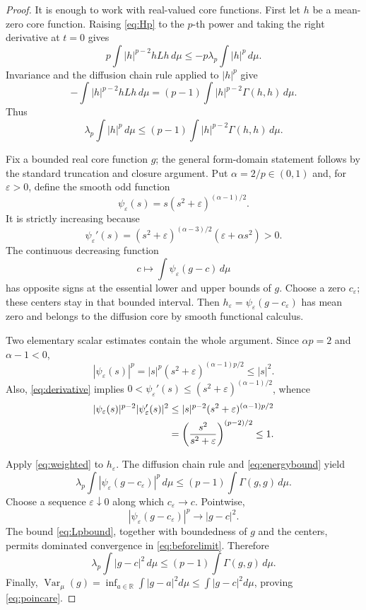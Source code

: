 \documentclass[11pt]{article}
\newcommand{\R}{\mathbb R}
\newcommand{\Var}{\operatorname{Var}_{\mu}}
\begin{document}
\begin{proof}
It is enough to work with real-valued core functions.  First let $h$ be a
mean-zero core function.  Raising \eqref{eq:Hp} to the $p$-th power and
taking the right derivative at $t=0$ gives
\[
 p\int |h|^{p-2}hLh\,d\mu
 \le -p\lambda_p\int|h|^p\,d\mu.
\]
Invariance and the diffusion chain rule applied to $|h|^p$ give
\[
 -\int |h|^{p-2}hLh\,d\mu
 =(p-1)\int|h|^{p-2}\Gamma(h,h)\,d\mu.
\]
Thus
\begin{equation}\label{eq:weighted}
 \lambda_p\int|h|^p\,d\mu
 \le(p-1)\int|h|^{p-2}\Gamma(h,h)\,d\mu.
\end{equation}

Fix a bounded real core function $g$; the general form-domain statement
follows by the standard truncation and closure argument.  Put
$\alpha=2/p\in(0,1)$ and, for $\varepsilon>0$, define the smooth odd function
\[
 \psi_\varepsilon(s)
 =s(s^2+\varepsilon)^{(\alpha-1)/2}.
\]
It is strictly increasing because
\begin{equation}\label{eq:derivative}
 \psi_\varepsilon'(s)
 =(s^2+\varepsilon)^{(\alpha-3)/2}
   (\varepsilon+\alpha s^2)>0.
\end{equation}
The continuous decreasing function
\[
 c\longmapsto\int\psi_\varepsilon(g-c)\,d\mu
\]
has opposite signs at the essential lower and upper bounds of $g$.
Choose a zero $c_\varepsilon$; these centers stay in that bounded interval.
Then
$h_\varepsilon=\psi_\varepsilon(g-c_\varepsilon)$ has mean zero and belongs
to the diffusion core by smooth functional calculus.

Two elementary scalar estimates contain the whole argument.  Since
$\alpha p=2$ and $\alpha-1<0$,
\begin{equation}\label{eq:Lpbound}
 |\psi_\varepsilon(s)|^p
 =|s|^p(s^2+\varepsilon)^{(\alpha-1)p/2}
 \le |s|^2.
\end{equation}
Also, \eqref{eq:derivative} implies
$0<\psi_\varepsilon'(s)\le
(s^2+\varepsilon)^{(\alpha-1)/2}$, whence
\begin{align}
 |\psi_\varepsilon(s)|^{p-2}
 |\psi_\varepsilon'(s)|^2
 &\le |s|^{p-2}
       (s^2+\varepsilon)^{(\alpha-1)p/2} \notag\\
 &=\left(\frac{s^2}{s^2+\varepsilon}\right)^{(p-2)/2}
 \le1.\label{eq:energybound}
\end{align}

Apply \eqref{eq:weighted} to $h_\varepsilon$.  The diffusion chain rule and
\eqref{eq:energybound} yield
\begin{equation}\label{eq:beforelimit}
 \lambda_p\int|\psi_\varepsilon(g-c_\varepsilon)|^p\,d\mu
 \le(p-1)\int\Gamma(g,g)\,d\mu.
\end{equation}
Choose a sequence $\varepsilon\downarrow0$ along which
$c_\varepsilon\to c$.  Pointwise,
\[
 |\psi_\varepsilon(g-c_\varepsilon)|^p
 \longrightarrow |g-c|^2.
\]
The bound \eqref{eq:Lpbound}, together with boundedness of $g$ and the
centers, permits dominated convergence in \eqref{eq:beforelimit}.  Therefore
\[
 \lambda_p\int|g-c|^2\,d\mu
 \le(p-1)\int\Gamma(g,g)\,d\mu.
\]
Finally,
$\Var(g)=\inf_{a\in\R}\int|g-a|^2d\mu\le\int|g-c|^2d\mu$, proving
\eqref{eq:poincare}.


\end{proof}
\end{document}
